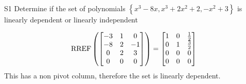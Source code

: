 \documentclass{sbgLAexam}
\begin{document}
\begin{extract}\newpage\end{extract}
\begin{problem}{S1}
Determine if the set of polynomials $\left\{ x^3-8x, x^3+2x^2+2, -x^2+3\right\}$ is  linearly dependent or linearly independent
\end{problem}
\begin{solution}
$$\operatorname{RREF}\left( \begin{bmatrix}-3 & 1 & 0 \\ -8 & 2 & -1 \\ 0 & 2 & 3 \\ 0 & 0 & 0\end{bmatrix}\right) = \begin{bmatrix} 1 & 0 & \frac{1}{2} \\ 0 & 1 & \frac{3}{2} \\ 0 & 0 & 0 \\ 0 & 0 & 0 \end{bmatrix}$$ 
This has a non pivot column, therefore the set is linearly dependent.
\end{solution}
\end{document}
